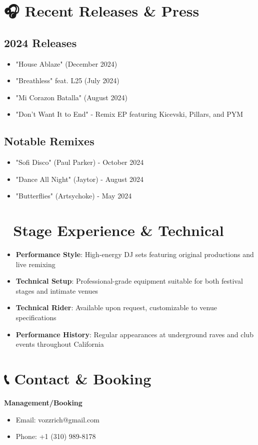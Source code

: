 \documentclass{article}
\begin{document}
\section*{🎧 Recent Releases \& Press}
\subsection*{2024 Releases}
\begin{itemize}
\item "House Ablaze" (December 2024)
\item "Breathless" feat. L25 (July 2024)
\item "Mi Corazon Batalla" (August 2024)
\item "Don't Want It to End" - Remix EP featuring Kicevski, Pillars, and PYM
\end{itemize}

\subsection*{Notable Remixes}
\begin{itemize}
\item "Sofi Disco" (Paul Parker) - October 2024
\item "Dance All Night" (Jaytor) - August 2024
\item "Butterflies" (Artsychoke) - May 2024
\end{itemize}

\section*{🎪 Stage Experience \& Technical}
\begin{itemize}
\item \textbf{Performance Style}: High-energy DJ sets featuring original productions and live remixing
\item \textbf{Technical Setup}: Professional-grade equipment suitable for both festival stages and intimate venues
\item \textbf{Technical Rider}: Available upon request, customizable to venue specifications
\item \textbf{Performance History}: Regular appearances at underground raves and club events throughout California
\end{itemize}

\section*{📞 Contact \& Booking}
\textbf{Management/Booking}
\begin{itemize}
\item Email: vozzrich@gmail.com
\item Phone: +1 (310) 989-8178
\end{itemize}
\end{document}
